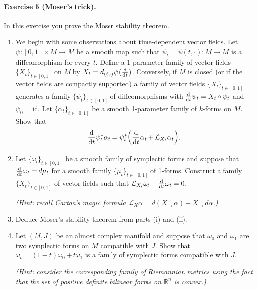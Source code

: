 \documentclass{article}
\theoremstyle{definition}
\newcommand{\id}{\mathrm{id}}
\renewcommand{\L}{\mathcal{L}}
\newcommand{\R}{\mathbb{R}}
\begin{document}
\paragraph{Exercise 5 {\normalfont(Moser's trick)}.} In this exercise you prove
the Moser stability theorem.
\begin{enumerate}[label=(\roman*)]
    \item We begin with some observations about time-dependent vector fields.
        Let $\psi:[0,1]\times M\to M$ be a smooth map such that
        $\psi_t=\psi(t,\cdot):M\to M$ is a diffeomorphism for every $t$. Define
        a 1-parameter family of vector fields $\{X_t\}_{t\in[0,1]}$ on $M$ by
        $X_t=d_{(t,\cdot)}\psi\bigl(\odv{}{t}\bigr)$. Conversely, if $M$ is
        closed (or if the vector fields are compactly supported) a family of
        vector fields $\{X_t\}_{t\in[0,1]}$ generates a family
        $\{\psi_t\}_{t\in[0,1]}$ of diffeomorphisms with
        $\odv{}{t}\psi_t=X_t\circ\psi_t$ and $\psi_0=\id$. Let
        $\{\alpha_t\}_{t\in[0,1]}$ be a smooth 1-parameter family of $k$-forms
        on $M$. Show that
        \begin{equation*}
            \odv{}{t}\psi_t^*\alpha_t
                = \psi_t^*\biggl(\odv{}{t}\alpha_t+\L_{X_t}\alpha_t\biggr).
        \end{equation*}

    \item Let $\{\omega_t\}_{t\in[0,1]}$ be a smooth family of symplectic forms
        and suppose that $\odv{}{t}\omega_t=d\mu_t$ for a smooth family
        $\{\mu_t\}_{t\in[0,1]}$ of 1-forms. Construct a family
        $\{X_t\}_{t\in[0,1]}$ of vector fields such that
        $\L_{X_t}\omega_t+\odv{}{t}\omega_t=0$.

        \textit{(Hint: recall Cartan's magic formula
        $\L_X\alpha=d(X\lrcorner\alpha)+X\lrcorner d\alpha$.)}

    \item Deduce Moser's stability theorem from parts (i) and (ii).

    \item Let $(M,J)$ be an almost complex manifold and suppose that $\omega_0$
        and $\omega_1$ are two symplectic forms on $M$ compatible with $J$. Show
        that $\omega_t=(1-t)\omega_0+t\omega_1$ is a family of symplectic forms
        compatible with $J$.

        \textit{(Hint: consider the corresponding family of Riemannian metrics
        using the fact that the set of positive definite bilinear forms on
        $\R^n$ is convex.)}


\end{enumerate}
\end{document}
